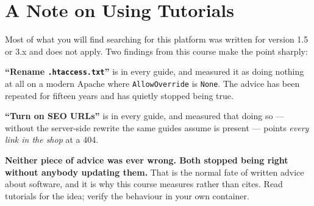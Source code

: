 \section{A Note on Using Tutorials}

Most of what you will find searching for this platform was written for version
1.5 or 3.x and does not apply. Two findings from this course make the point
sharply:

\begin{tight}
  \item \textbf{``Rename \texttt{.htaccess.txt}''} is in every guide, and
         measured it as doing nothing at all on a modern Apache
        where \texttt{AllowOverride} is \texttt{None}. The advice has been
        repeated for fifteen years and has quietly stopped being true.
  \item \textbf{``Turn on SEO URLs''} is in every guide, and 
        measured that doing so --- without the server-side rewrite the same
        guides assume is present --- points \emph{every link in the shop} at a
        404.
\end{tight}

\smallskip
\textbf{Neither piece of advice was ever wrong. Both stopped being right
without anybody updating them.} That is the normal fate of written advice about
software, and it is why this course measures rather than cites. Read tutorials
for the idea; verify the behaviour in your own container.
